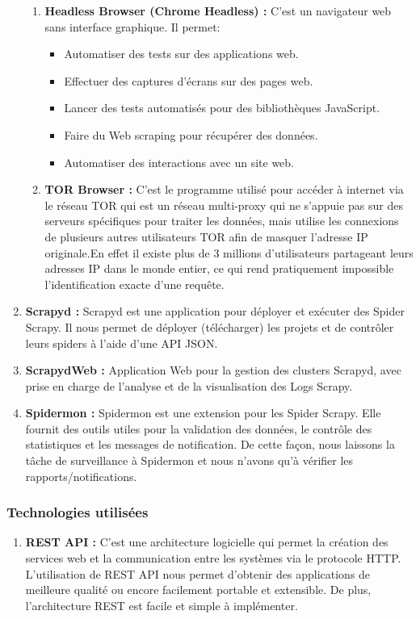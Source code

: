 \begin{enumerate}
\begin{enumerate}
    \item	\textbf{Headless Browser (Chrome Headless) \cite{headlessbrowser} :} C'est un navigateur web sans interface graphique. Il permet:\\
    \begin{itemize}
        \item Automatiser des tests sur des applications web.
        \item Effectuer des captures d'écrans sur des pages web.
        \item Lancer des tests automatisés pour des bibliothèques JavaScript.
        \item Faire du Web scraping pour récupérer des données.
        \item Automatiser des interactions avec un site web.
    \end{itemize}



    \item	\textbf{TOR Browser \cite{torbrowser} :} C’est le programme utilisé pour accéder à internet via le réseau TOR qui est un réseau multi-proxy qui ne s’appuie pas sur des serveurs spécifiques pour traiter les données, mais utilise les connexions de plusieurs autres utilisateurs TOR afin de masquer l’adresse IP originale.En effet il existe plus de 3 millions d’utilisateurs partageant leurs adresses IP dans le monde entier, ce qui rend pratiquement impossible l’identification exacte d’une requête.
\end{enumerate}
\item	\textbf{Scrapyd :} Scrapyd est une application pour déployer et exécuter des Spider Scrapy. Il nous permet de déployer (télécharger) les projets et de contrôler leurs spiders à l'aide d'une API JSON.
\item \textbf{ScrapydWeb :} Application Web pour la gestion des clusters Scrapyd, avec prise en charge de l'analyse et de la visualisation des Logs Scrapy.
\item	\textbf{Spidermon \cite{spidermon} :} Spidermon est une extension pour les Spider Scrapy. Elle fournit des outils utiles pour la validation des données, le contrôle des statistiques et les messages de notification. De cette façon, nous laissons la tâche de surveillance à Spidermon et nous n'avons qu'à vérifier les rapports/notifications.



\end{enumerate}
\subsubsection{Technologies utilisées }
\begin{enumerate}
\item 	\textbf{REST API \cite{rest} :} C’est une architecture logicielle qui permet la création des services web et la communication entre les systèmes via le protocole HTTP. L’utilisation de REST API nous permet d’obtenir des applications de meilleure qualité ou encore facilement portable et extensible. De plus, l’architecture REST est facile et simple à implémenter.
\end{enumerate}




